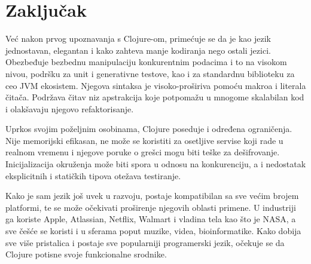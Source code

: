 \section{Zaključak}
\label{sec:zakljucak}

Već nakon prvog upoznavanja s Clojure-om, primećuje se da je kao jezik jednostavan, elegantan i kako zahteva manje kodiranja nego ostali jezici. Obezbeđuje bezbednu manipulaciju konkurentnim podacima i to na visokom nivou, podršku za unit i generativne testove, kao i za standardnu biblioteku za ceo JVM ekosistem. Njegova sintaksa je visoko-proširiva pomoću makroa i literala čitača. Podržava čitav niz apstrakcija koje potpomažu u mnogome skalabilan kod i olakšavaju njegovo refaktorisanje.

Uprkos svojim poželjnim osobinama, Clojure poseduje i određena ograničenja. Nije memorijski efikasan, ne može se koristiti za osetljive servise koji rade u realnom vremenu i njegove poruke o grešci mogu biti teške za dešifrovanje. Inicijalizacija okruženja može biti spora u odnosu na konkurenciju, a i nedostatak eksplicitnih i statičkih  tipova otežava testiranje.

Kako je sam jezik još uvek u razvoju, postaje kompatibilan sa sve većim brojem platformi, te se može  očekivati proširenje njegovih oblasti primene. U industriji ga koriste Apple, Atlassian, Netflix, Walmart i vladina tela kao što je NASA, a sve češće se koristi i u sferama poput muzike, videa, bioinformatike. Kako dobija sve više pristalica i postaje sve popularniji programerski jezik, očekuje se da Clojure potisne svoje funkcionalne srodnike.